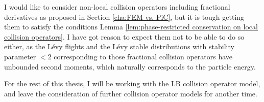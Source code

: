     \begin{remark}
        I would like to consider non-local collision operators including fractional derivatives as proposed in Section \ref{cha:FEM vs. PiC}, but it is tough getting them to satisfy the conditions Lemma \ref{lem:phase-restricted conservation on local collision operators}. I have got reason to expect them not to be able to do so either, as the Lévy flights and the Lévy stable distributions with stability parameter $< 2$ corresponding to those fractional collision operators have unbounded second moments, which naturally corresponds to the particle energy.

        For the rest of this thesis, I will be working with the LB collision operator model, and leave the consideration of further collision operator models for another time.
    \end{remark}
    